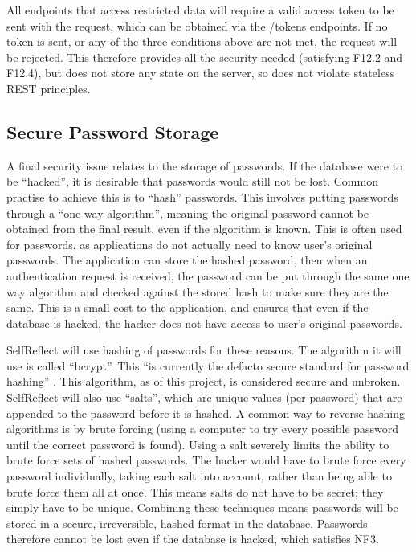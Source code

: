 \documentclass[11pt,openright,a4paper]{report}
\begin{document}
All endpoints that access restricted data will require a valid access token to be sent with the request, which can be obtained via the /tokens endpoints. If no token is sent, or any of the three conditions above are not met, the request will be rejected. This therefore provides all the security needed (satisfying F12.2 and F12.4), but does not store any state on the server, so does not violate stateless REST principles.

\subsection{Secure Password Storage}
A final security issue relates to the storage of passwords. If the database were to be \enquote{hacked}, it is desirable that passwords would still not be lost. Common practise to achieve this is to \enquote{hash} passwords. This involves putting passwords through a \enquote{one way algorithm}, meaning the original password cannot be obtained from the final result, even if the algorithm is known. This is often used for passwords, as applications do not actually need to know user's original passwords. The application can store the hashed password, then when an authentication request is received, the password can be put through the same one way algorithm and checked against the stored hash to make sure they are the same. This is a small cost to the application, and ensures that even if the database is hacked, the hacker does not have access to user's original passwords.

SelfReflect will use hashing of passwords for these reasons. The algorithm it will use is called \enquote{bcrypt}. This \enquote{is currently the defacto secure standard for password hashing} \parencite{bcryptblog}. This algorithm, as of this project, is considered secure and unbroken. SelfReflect will also use \enquote{salts}, which are unique values (per password) that are appended to the password before it is hashed. A common way to reverse hashing algorithms is by brute forcing (using a computer to try every possible password until the correct password is found). Using a salt severely limits the ability to brute force sets of hashed passwords. The hacker would have to brute force every password individually, taking each salt into account, rather than being able to brute force them all at once. This means salts do not have to be secret; they simply have to be unique. Combining these techniques means passwords will be stored in a secure, irreversible, hashed format in the database. Passwords therefore cannot be lost even if the database is hacked, which satisfies NF3.
\end{document}

